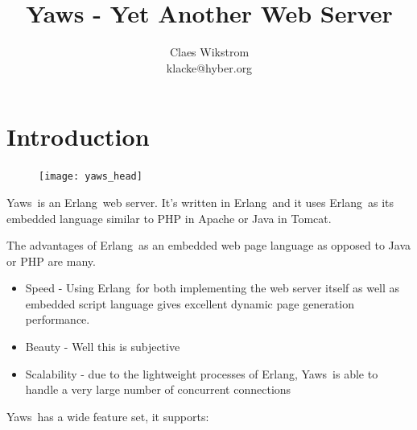 \documentclass[11pt,oneside,english]{book}
\newcommand{\Erlang}            %
        {{\sc Erlang}}
\newcommand{\Yaws}            %
        {{\sc Yaws}}
\begin{document}
\title{Yaws - Yet Another Web Server}


\author{Claes Wikstrom\\
klacke@hyber.org}





\maketitle
\tableofcontents{}



\chapter{Introduction}


\begin{figure}[h]
\begin{center}

 \texttt{[image: yaws\_head]}

\end{center}
\end{figure}

\Yaws\  is an \Erlang\  web server. It's written in \Erlang\  and it uses
\Erlang\  as its embedded language similar to PHP in Apache or Java in Tomcat.

The advantages of \Erlang\  as an embedded web page language as opposed to
Java or PHP are many.
\begin{itemize}

\item{Speed - Using \Erlang\  for both implementing the web server itself as well
as embedded script language gives excellent dynamic page generation
performance.}

\item{Beauty - Well this is subjective}

\item{Scalability - due to the lightweight processes of \Erlang{}, \Yaws\
is able to handle a very large number of concurrent connections}

\end{itemize}

\Yaws\  has a wide feature set, it supports:
\end{document}
